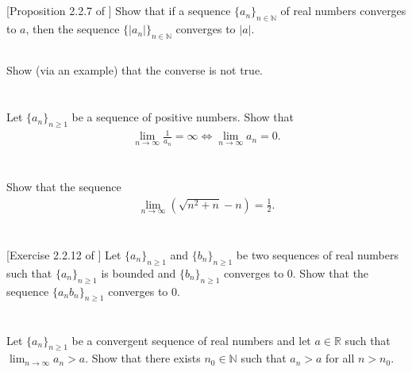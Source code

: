 \documentclass[11pt,letterpaper]{article}
\begin{document}
\subsection{} [Proposition 2.2.7 of \cite{Lebl_23}] Show that if a sequence $\{a_n\}_{n\in\mathbb{N}}$ of real numbers converges to $a$, then the sequence $\{|a_n|\}_{n\in\mathbb{N}}$ converges to $|a|$. 
\subsection{} Show (via an example) that the converse is not true.

\section{}
Let $\{a_n\}_{n\geq 1}$ be a sequence of positive numbers. Show that
\begin{align}
    \lim_{n\to\infty}\frac{1}{a_n} = \infty \iff \lim_{n\to\infty}a_n = 0.
\end{align}

\section{}
Show that the sequence
\begin{align}
    \lim_{n\to\infty} \left(\sqrt{n^2+n}-n\right) = \frac{1}{2}. 
\end{align}

\section{}
[Exercise 2.2.12 of \cite{Lebl_23}] Let $\{a_n\}_{n\geq 1}$ and $\{b_n\}_{n\geq 1}$ be two sequences of real numbers such that $\{a_n\}_{n\geq 1}$ is bounded and $\{b_n\}_{n\geq 1}$ converges to $0$. Show that the sequence $\{a_nb_n\}_{n\geq 1}$ converges to 0.

\section{}
Let $\{a_n\}_{n\geq 1}$ be a convergent sequence of real numbers and let $a\in\mathbb{R}$ such that $\lim_{n\to\infty} a_n>a$. Show that there exists $n_0 \in \mathbb{N}$ such that $a_n > a$ for all
$n > n_0$.


\vfill
\printbibliography
\end{document}
